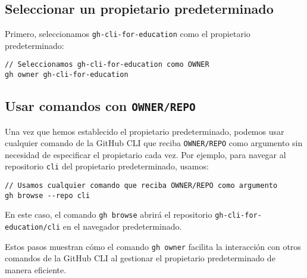 \subsection{Seleccionar un propietario predeterminado}

Primero, seleccionamos \texttt{gh-cli-for-education} como el propietario predeterminado:

\begin{verbatim}
// Seleccionamos gh-cli-for-education como OWNER
gh owner gh-cli-for-education
\end{verbatim}

\subsection{Usar comandos con \texttt{OWNER/REPO}}

Una vez que hemos establecido el propietario predeterminado, podemos usar cualquier comando de la GitHub CLI que reciba \texttt{OWNER/REPO} como argumento sin necesidad de especificar el propietario cada vez. Por ejemplo, para navegar al repositorio \texttt{cli} del propietario predeterminado, usamos:

\begin{verbatim}
// Usamos cualquier comando que reciba OWNER/REPO como argumento
gh browse --repo cli
\end{verbatim}

En este caso, el comando \texttt{gh browse} abrirá el repositorio \texttt{gh-cli-for-education/cli} en el navegador predeterminado.

Estos pasos muestran cómo el comando \texttt{gh owner} facilita la interacción con otros comandos de la GitHub CLI al gestionar el propietario predeterminado de manera eficiente.
